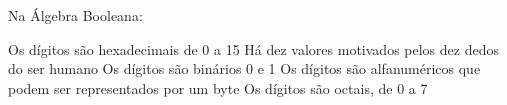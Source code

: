 \documentclass[12pt, addpoints]{exam}
\begin{document}
    \begin{questions}

    \newpage
    \question

Na Álgebra Booleana:
\begin{choices}
\choice Os dígitos são hexadecimais de 0 a 15
\choice Há dez valores motivados pelos dez dedos do ser humano
\choice Os dígitos são binários 0 e 1
\choice Os dígitos são alfanuméricos que podem ser representados por um byte
\choice Os dígitos são octais, de 0 a 7
\end{choices}



    \end{questions}
    
\end{document}
